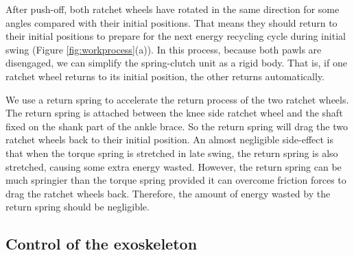 \documentclass[twocolumn,cleanfoot,10pt]{asme2ej}
\begin{document}
After push-off, both ratchet wheels have rotated in the same direction for some angles compared with their initial positions. That means they should return to their initial positions to prepare for the next energy recycling cycle during initial swing (Figure \ref{fig:workprocess}(a)). In this process, because both pawls are disengaged, we can simplify the spring-clutch unit as a rigid body. That is, if one ratchet wheel returns to its initial position, the other returns automatically.

We use a return spring to accelerate the return process of the two ratchet wheels. The return spring is attached between the knee side ratchet wheel and the shaft fixed on the shank part of the ankle brace. So the return spring will drag the two ratchet wheels back to their initial position. An almost negligible side-effect is that when the torque spring is stretched in late swing, the return spring is also stretched, causing some extra energy wasted. However, the return spring can be much springier than the torque spring provided it can overcome friction forces to drag the ratchet wheels back. Therefore, the amount of energy wasted by the return spring should be negligible. 


\subsection{Control of the exoskeleton}
\end{document}
